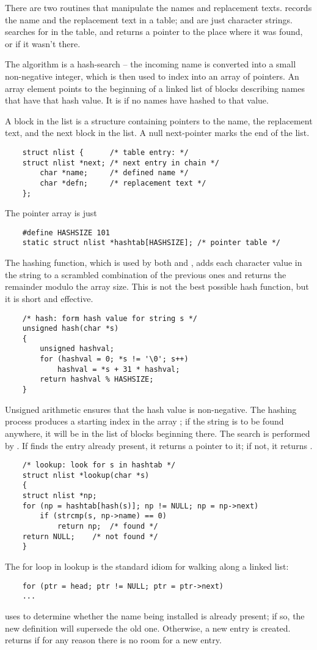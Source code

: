 There are two routines that manipulate the names and replacement texts.
 records the name  and the replacement text  in a table;  and  are just character strings.
 searches for  in the table, and returns a pointer to the place where it was found, or  if it wasn't there.

The algorithm is a hash-search -- the incoming name is converted into a small non-negative integer, which is then used to index into an array of pointers.
An array element points to the beginning of a linked list of blocks describing names that have that hash value. It is  if no names have hashed to that value.

A block in the list is a structure containing pointers to the name, the replacement text, and the next block in the list. A null next-pointer marks the end of the list.
\begin{lstlisting}
	struct nlist { 		/* table entry: */
	struct nlist *next; /* next entry in chain */
		char *name; 	/* defined name */
		char *defn; 	/* replacement text */
	};
\end{lstlisting}
The pointer array is just
\begin{lstlisting}
	#define HASHSIZE 101
	static struct nlist *hashtab[HASHSIZE]; /* pointer table */
\end{lstlisting}
The hashing function, which is used by both  and , adds each character value in the string to a scrambled combination of the previous ones and returns the remainder modulo
the array size. This is not the best possible hash function, but it is short and effective.
\begin{lstlisting}
	/* hash: form hash value for string s */
	unsigned hash(char *s)
	{
		unsigned hashval;
		for (hashval = 0; *s != '\0'; s++)
			hashval = *s + 31 * hashval;
		return hashval % HASHSIZE;
	}
\end{lstlisting}
Unsigned arithmetic ensures that the hash value is non-negative.
The hashing process produces a starting index in the array ; if the string is to be found anywhere, it will be in the list of blocks beginning there.
The search is performed by . If  finds the entry already present, it returns a pointer to it; if not, it returns .
\begin{lstlisting}
	/* lookup: look for s in hashtab */
	struct nlist *lookup(char *s)
	{
	struct nlist *np;
	for (np = hashtab[hash(s)]; np != NULL; np = np->next)
		if (strcmp(s, np->name) == 0)
			return np; 	/* found */
	return NULL; 	/* not found */
	}
\end{lstlisting}
The for loop in lookup is the standard idiom for walking along a linked list:
\begin{lstlisting}
	for (ptr = head; ptr != NULL; ptr = ptr->next)
	...
\end{lstlisting}
 uses  to determine whether the name being installed is already present; if so, the new definition will supersede the old one.
Otherwise, a new entry is created.  returns  if for any reason there is no room for a new entry.

